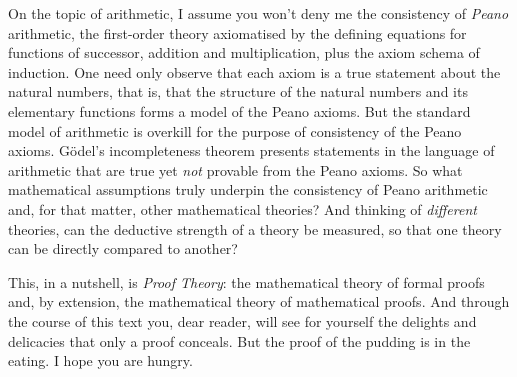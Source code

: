 
On the topic of arithmetic, I assume you won't deny me the consistency of \emph{Peano} arithmetic, the first-order theory axiomatised by the defining equations for functions of successor, addition and multiplication, plus the axiom schema of induction.
One need only observe that each axiom is a true statement about the natural numbers, that is, that the structure of the natural numbers and its elementary functions forms a model of the Peano axioms.
But the standard model of arithmetic is overkill for the purpose of consistency of the Peano axioms.
Gödel's incompleteness theorem presents statements in the language of arithmetic that are true yet \emph{not} provable from the Peano axioms.
So what mathematical assumptions truly underpin the consistency of Peano arithmetic and, for that matter, other mathematical theories?
And thinking of \emph{different} theories, 
can the deductive strength of a theory be measured, so that one theory can be directly compared to another?

This, in a nutshell, is
\emph{Proof Theory}: the mathematical theory of formal proofs and, by extension, the mathematical theory of mathematical proofs.
%
And through the course of this text you, dear reader, will see  for yourself the delights and delicacies that only a proof conceals.
%
But the proof of the pudding is in the eating.
%
I hope you are hungry.

